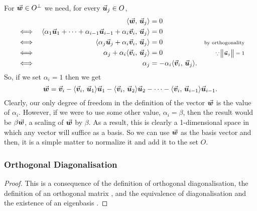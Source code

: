 \documentclass[../MathsNotesBase.tex]{subfiles}
\begin{document}
{		For ${ \vec{\bm{w}} \in O^\perp }$ we need, for every ${ \vec{\bm{u}}_j \in O }$,
		\[\begin{aligned}
			&& \langle \vec{\bm{w}},\, \vec{\bm{u}}_j \rangle &= 0 \\
			&\iff & \langle \alpha_1 \vec{\bm{u}}_1 + \cdots + \alpha_{i-1} \vec{\bm{u}}_{i-1} + \alpha_i \vec{\bm{v}}_i,\, \vec{\bm{u}}_j \rangle &= 0 \\
			&\iff & \langle \alpha_j \vec{\bm{u}}_j + \alpha_i \vec{\bm{v}}_i,\, \vec{\bm{u}}_j \rangle &= 0 &\text{\scriptsize{by orthogonality}} \\
			&\iff & \alpha_j + \alpha_i \langle \vec{\bm{v}}_i,\, \vec{\bm{u}}_j \rangle  &= 0 &\text{\scriptsize{${ \because \norm{\vec{\bm{u}}_j} = 1 }$}} \\
			&\iff & \alpha_j &= -\alpha_i \langle \vec{\bm{v}}_i,\, \vec{\bm{u}}_j \rangle.
		\end{aligned}\]
		So, if we set ${ \alpha_i = 1 }$ then we get
		\[ \vec{\bm{w}} = \vec{\bm{v}}_i - \langle \vec{\bm{v}}_i,\, \vec{\bm{u}}_1 \rangle\vec{\bm{u}}_1 - \langle \vec{\bm{v}}_i,\, \vec{\bm{u}}_2 \rangle\vec{\bm{u}}_2 - \cdots - \langle \vec{\bm{v}}_i,\, \vec{\bm{u}}_{i-1} \rangle\vec{\bm{u}}_{i-1}. \]
		Clearly, our only degree of freedom in the definition of the vector $\vec{\bm{w}}$ is the value of $\alpha_i$. However, if we were to use some other value, ${ \alpha_i = \beta }$, then the result would be ${ \beta \vec{\bm{w}} }$, a scaling of $\vec{\bm{w}}$ by $\beta$. As a result, this is clearly a 1-dimensional space in which any vector will suffice as a basis. So we can use $\vec{\bm{w}}$ as the basis vector and then, it is a simple matter to normalize it and add it to the set $O$.
		
		
		
		\biggerskip
		\subsubsection{Orthogonal Diagonalisation}
		\bigskip
		
		\medskip
		\begin{proof}
			This is a consequence of the definition of orthogonal diagonalisation, the definition of an orthogonal matrix \addref, and the equivalence of diagonalisation and the existence of an eigenbasis \addref.
		\end{proof}
	
	
}
\end{document}
